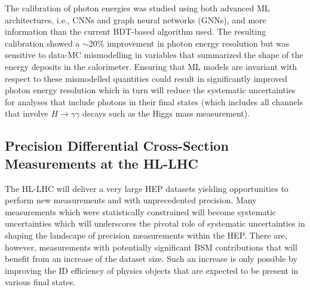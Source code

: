 \documentclass[letter, USenglish, 11pt, subfigure]{article}
\begin{document}
The calibration of photon energies was studied using both advanced ML architectures, i.e., CNNs and graph neural networks (GNNs), and more information than the current BDT-based algorithm used. The resulting calibration showed a $\sim$20\% improvement in photon energy resolution but was sensitive to data-MC mismodelling in variables that summarized the shape of the energy deposits in the calorimeter. Ensuring that ML models are invariant with respect to these mismodelled quantities could result in significantly improved photon energy resolution which in turn will reduce the systematic uncertainties for analyses that include photons in their final states (which includes all channels that involve $H\to\gamma\gamma$ decays such as the Higgs mass measurement).

\clearpage
\subsection{Precision Differential Cross-Section Measurements at the HL-LHC}
The HL-LHC will deliver a very large HEP datasets yielding opportunities to perform new measurements and with unprecedented precision.
Many measurements which were statistically constrained will become systematic uncertainties which will underscores the pivotal role of systematic uncertainties in shaping the landscape of precision measurements within the HEP. There are, however, measurements with potentially significant BSM contributions that will benefit from an increase of the dataset size. Such an increase is only possible by improving the ID efficiency of physics objects that are expected to be present in various final states. 
\end{document}
